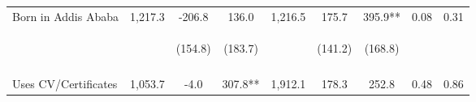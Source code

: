 \begin{tabular}{lcccccccc}
\noalign{\smallskip}Born in Addis Ababa & 1,217.3 & -206.8 & 136.0 & 1,216.5 & 175.7 & 395.9** & 0.08 & 0.31\\
 & \begin{footnotesize}\end{footnotesize} & \begin{footnotesize}(154.8)\end{footnotesize} & \begin{footnotesize}(183.7)\end{footnotesize} & \begin{footnotesize}\end{footnotesize} & \begin{footnotesize}(141.2)\end{footnotesize} & \begin{footnotesize}(168.8)\end{footnotesize} & \begin{footnotesize}\end{footnotesize} & \begin{footnotesize}\end{footnotesize}\\
 & \begin{footnotesize}\end{footnotesize} & \begin{footnotesize}[1.000]\end{footnotesize} & \begin{footnotesize}[0.114]\end{footnotesize} & \begin{footnotesize}\end{footnotesize} & \begin{footnotesize}[1.000]\end{footnotesize} & \begin{footnotesize}[0.160]\end{footnotesize} & \begin{footnotesize}\end{footnotesize} & \begin{footnotesize}\end{footnotesize}\\
\noalign{\smallskip}Uses CV/Certificates & 1,053.7 & -4.0 & 307.8** & 1,912.1 & 178.3 & 252.8 & 0.48 & 0.86\\

\end{tabular}
